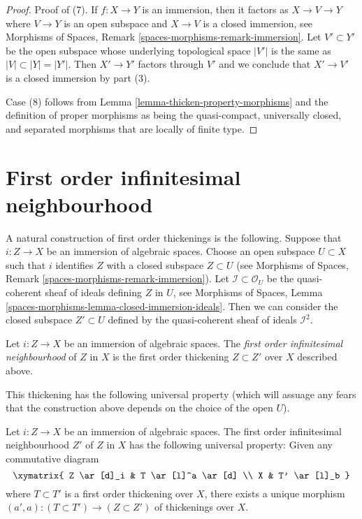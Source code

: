 \begin{proof}
\medskip\noindent
Proof of (7). If $f : X \to Y$ is an immersion, then it factors as
$X \to V \to Y$ where $V \to Y$ is an open subspace and $X \to V$ is a
closed immersion, see
Morphisms of Spaces, Remark \ref{spaces-morphisms-remark-immersion}.
Let $V' \subset Y'$ be the open subspace whose
underlying topological space $|V'|$ is the same as $|V| \subset |Y| = |Y'|$.
Then $X' \to Y'$ factors through $V'$ and we conclude that $X' \to V'$
is a closed immersion by part (3).

\medskip\noindent
Case (8) follows from Lemma \ref{lemma-thicken-property-morphisms}
and the definition of proper morphisms as being the quasi-compact,
universally closed, and separated morphisms that are locally of finite type.
\end{proof}








\section{First order infinitesimal neighbourhood}
\label{section-first-order-infinitesimal-neighbourhood}

\noindent
A natural construction of first order thickenings is the following.
Suppose that $i : Z \to X$ be an immersion of algebraic spaces. Choose an
open subspace $U \subset X$ such that $i$ identifies $Z$ with a closed
subspace $Z \subset U$ (see
Morphisms of Spaces, Remark \ref{spaces-morphisms-remark-immersion}).
Let $\mathcal{I} \subset \mathcal{O}_U$ be the
quasi-coherent sheaf of ideals defining $Z$ in $U$, see
Morphisms of Spaces,
Lemma \ref{spaces-morphisms-lemma-closed-immersion-ideals}.
Then we can consider
the closed subspace $Z' \subset U$ defined by the quasi-coherent sheaf
of ideals $\mathcal{I}^2$.

\begin{definition}
\label{definition-first-order-infinitesimal-neighbourhood}
Let $i : Z \to X$ be an immersion of algebraic spaces. The
{\it first order infinitesimal neighbourhood} of $Z$ in $X$ is
the first order thickening $Z \subset Z'$ over $X$ described above.
\end{definition}

\noindent
This thickening has the following universal property (which will assuage
any fears that the construction above depends on the choice of the open
$U$).

\begin{lemma}
\label{lemma-first-order-infinitesimal-neighbourhood}
Let $i : Z \to X$ be an immersion of algebraic spaces.
The first order infinitesimal neighbourhood $Z'$ of $Z$ in $X$
has the following universal property:
Given any commutative diagram
$$
\xymatrix{
Z \ar[d]_i & T \ar[l]^a \ar[d] \\
X & T' \ar[l]_b
}
$$
where $T \subset T'$ is a first order thickening over $X$, there exists
a unique morphism $(a', a) : (T \subset T') \to (Z \subset Z')$ of
thickenings over $X$.
\end{lemma}

